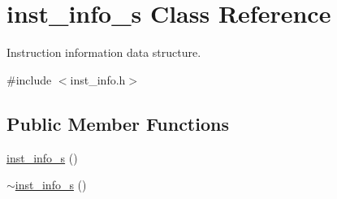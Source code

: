 \hypertarget{classinst__info__s}{
\section{inst\_\-info\_\-s Class Reference}
\label{classinst__info__s}
}


Instruction information data structure.  




{\ttfamily \#include $<$inst\_\-info.h$>$}

\subsection*{Public Member Functions}
\begin{DoxyCompactItemize}
\item 
\hyperlink{classinst__info__s_a9ed9c6e4c2707d9495a69d4b0b6b8b4c}{inst\_\-info\_\-s} ()
\item 
\hyperlink{classinst__info__s_a196aeffd41b2a5ddbf7b69865e5cd839}{$\sim$inst\_\-info\_\-s} ()
\end{DoxyCompactItemize}
